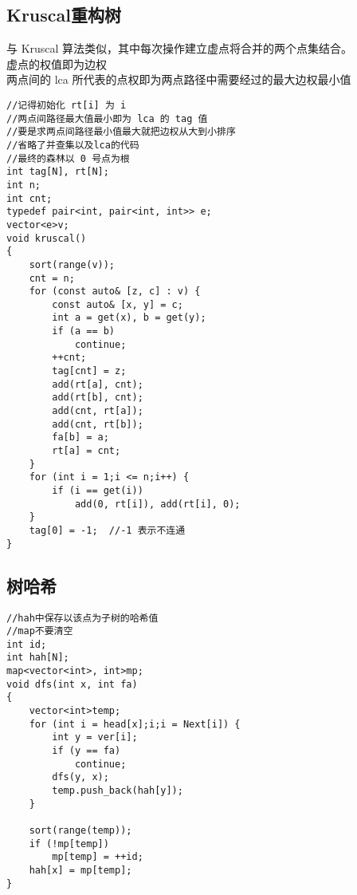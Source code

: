 \documentclass[twocolumn,a4]{article}
\begin{document}
\subsection{Kruscal重构树}
与 Kruscal 算法类似，其中每次操作建立虚点将合并的两个点集结合。
\\虚点的权值即为边权
\\两点间的 lca 所代表的点权即为两点路径中需要经过的最大边权最小值
\begin{lstlisting}
//记得初始化 rt[i] 为 i
//两点间路径最大值最小即为 lca 的 tag 值
//要是求两点间路径最小值最大就把边权从大到小排序
//省略了并查集以及lca的代码
//最终的森林以 0 号点为根
int tag[N], rt[N];
int n;
int cnt;
typedef pair<int, pair<int, int>> e;
vector<e>v;
void kruscal()
{
    sort(range(v));
    cnt = n;
    for (const auto& [z, c] : v) {
        const auto& [x, y] = c;
        int a = get(x), b = get(y);
        if (a == b)
            continue;
        ++cnt;
        tag[cnt] = z;
        add(rt[a], cnt);
        add(rt[b], cnt);
        add(cnt, rt[a]);
        add(cnt, rt[b]);
        fa[b] = a;
        rt[a] = cnt;
    }
    for (int i = 1;i <= n;i++) {
        if (i == get(i))
            add(0, rt[i]), add(rt[i], 0);
    }
    tag[0] = -1;  //-1 表示不连通
}

\end{lstlisting}

\subsection{树哈希}
\begin{lstlisting}
//hah中保存以该点为子树的哈希值
//map不要清空
int id;
int hah[N];
map<vector<int>, int>mp;
void dfs(int x, int fa)
{
    vector<int>temp;
    for (int i = head[x];i;i = Next[i]) {
        int y = ver[i];
        if (y == fa)
            continue;
        dfs(y, x);
        temp.push_back(hah[y]);
    }

    sort(range(temp));
    if (!mp[temp])
        mp[temp] = ++id;
    hah[x] = mp[temp];
}

\end{lstlisting}
\end{document}
